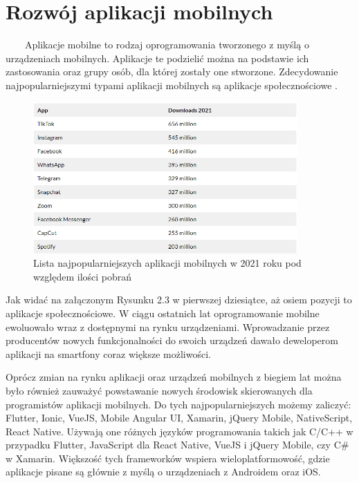 \documentclass[a4paper,12pt,oneside]{book}
\begin{document}
	\section{Rozwój aplikacji mobilnych}
	\ \ \ \
	Aplikacje mobilne to rodzaj oprogramowania tworzonego z myślą o urządzeniach mobilnych. Aplikacje te podzielić można na podstawie ich zastosowania oraz grupy osób, dla której zostały one stworzone. Zdecydowanie najpopularniejszymi typami aplikacji mobilnych są aplikacje społecznościowe \cite{ref12}.
	
	\begin{figure}[h]
		\centering
		\includegraphics[width=0.9\textwidth]{grafika/most_popular_apps_2021.png}
		\caption{Lista najpopularniejszych aplikacji mobilnych w 2021 roku pod względem ilości pobrań}
	\end{figure}

	Jak widać na załączonym Rysunku 2.3 w pierwszej dziesiątce, aż osiem pozycji to aplikacje społecznościowe.  W ciągu ostatnich lat oprogramowanie mobilne ewoluowało wraz z dostępnymi na rynku urządzeniami. Wprowadzanie przez producentów nowych funkcjonalności do swoich urządzeń dawało deweloperom aplikacji na smartfony coraz większe możliwości. 
	
	\newpage
	
	Oprócz zmian na rynku aplikacji oraz urządzeń mobilnych z biegiem lat można było również zauważyć powstawanie nowych środowisk skierowanych dla programistów aplikacji mobilnych. Do tych najpopularniejszych możemy zaliczyć: Flutter, Ionic, VueJS, Mobile Angular UI, Xamarin, jQuery Mobile, NativeScript, React Native. Używają one różnych języków programowania takich jak C/C++ w przypadku Flutter, JavaScript dla React Native, VueJS i jQuery Mobile, czy C\# w Xamarin. Większość tych frameworków wspiera wieloplatformowość, gdzie aplikacje pisane są głównie z myślą o urządzeniach z Androidem oraz iOS.
	
\end{document}
